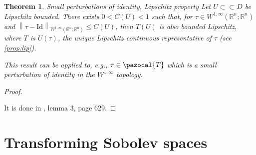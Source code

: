 \documentclass[english,a4paper,12pt,oneside]{scrbook}
\theoremstyle{break}
\newtheorem{thm}[equation]{Theorem}
\newtheorem{prop}[equation]{Proposition}
\newenvironment{mproof}[1][\proofname]{%
  \begin{proof}[#1]$ $\par\nobreak\ignorespaces
}{%
  \end{proof}
}
\renewcommand*{\proofname}{Proof}
\theoremstyle{remark}
\newcommand{\mR}{\mathbb{R}}
\newcommand{\norm}[1]{\left\lVert#1\right\rVert}
\newcommand{\cc}{\subset\subset}
\newcommand{\cT}{\pazocal{T}}
\newcommand{\id}{\text{Id}}
\newcommand{\te}{\theta}
\newcommand{\Te}{\Theta}
\begin{document}
\begin{thm}{Small perturbations of identity, Lipschitz property}
\label{thm:ptb_id_lip}
Let $U\cc D$ be Lipschitz bounded. There exists $0<C(U)<1$ such that, for $\tau \in W^{1,\infty}(\mR^n;\mR^n)$ and $\norm{\tau - \id}_{W^{1,\infty}(\mR^n;\mR^n)}\leq C(U)$, then $T(U)$ is also bounded Lipschitz, where $T$ is $U(\tau)$, the unique Lipschitz continuous representative of $\tau$ (see \cref{prop:lip}).

This result can be applied to, e.g., $\tau \in \cT$ which is a small perturbation of identity in the $W^{1,\infty}$ topology.
\end{thm}

\begin{mproof}
It is done in \cite{bello}, lemma 3, page 629.
\end{mproof}

%
%
%
%
%
%
%
%
%
%
%

\section{Transforming Sobolev spaces}
\end{document}
